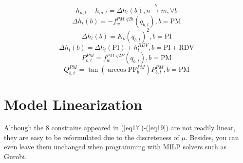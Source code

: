 \documentclass[journal,twoside,web]{ieeecolor}
\begin{document}
\begin{equation}\label{pplnd}
    h_{n,t} - h_{m,t}= \Delta h_t(b),n\overset{b}{\rightarrow}m, \forall b
\end{equation}
\begin{equation}\label{bispump}
    \Delta h_t(b) = -f^{PM,q2h}_w(q_{b,t}),b = \text{PM}
\end{equation}
\begin{equation}\label{bispipe}
    \Delta h_t(b) = K_b(q_{b,t})^2,b = \text{PI}
\end{equation}
\begin{equation}\label{bisrdvpipe}
    \Delta h_t(b) = \Delta h_t(\text{PI}) + h^{RDV}_t,b = \text{PI}+\text{RDV}
\end{equation}
\begin{equation}\label{ppc}
    P^{PM}_{b,t} = f^{PM,q2P}_w(q_{b,t}), b = \text{PM}
\end{equation}
\begin{equation}\label{PM_rea}
    Q^{PM}_{b,t} = \tan (\arccos \text{PF}^{PM}_b) P^{PM}_{b,t}, b = \text{PM}
\end{equation}

\section{Model Linearization}
Although the 8 constrains appeared in (\ref{eq17})-(\ref{eq19}) are not readily linear, they are easy to be reformulated due to the discreteness of $\mu$.
Besides, you can even leave them unchanged when programming with MILP solvers such as Gurobi.
\end{document}

